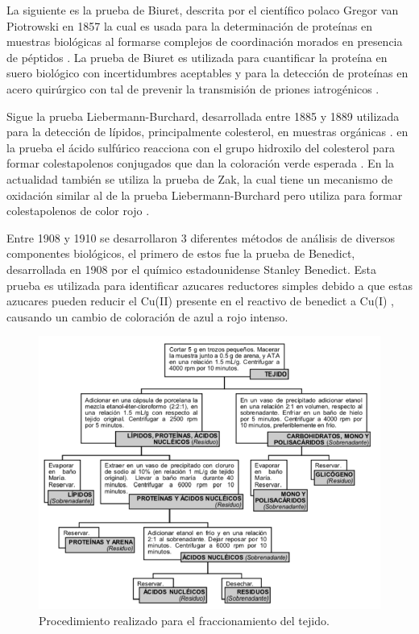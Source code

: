 \documentclass[fleqn,10pt]{SelfArx}
\begin{document}
	La siguiente es la prueba de Biuret, descrita por el científico polaco Gregor van Piotrowski en 1857 \cite{von1857neue} la cual es usada para la determinación de proteínas en muestras biológicas al formarse complejos de coordinación morados en presencia de péptidos \cite{rose1833ueber}. La prueba de Biuret es utilizada para cuantificar la proteína en suero biológico con incertidumbres aceptables \cite{zheng2017measurement} y para la detección de proteínas en acero quirúrgico con tal de prevenir la transmisión de priones iatrogénicos \cite{lipscomb2006sensitivity}.
	
	Sigue la prueba Liebermann-Burchard, desarrollada entre 1885 y 1889 \cite{xiong2007liebermann} utilizada para la detección de lípidos, principalmente colesterol, en muestras orgánicas \cite{barreto2005lipid}. en la prueba el ácido sulfúrico reacciona con el grupo hidroxilo del colesterol para formar colestapolenos conjugados que dan la coloración verde esperada \cite{xiong2007liebermann, burke1974mechanisms}. En la actualidad también se utiliza la prueba de Zak, la cual tiene un mecanismo de oxidación similar al de la prueba Liebermann-Burchard pero utiliza  para formar colestapolenos de color rojo \cite{burke1974mechanisms}.
	
	Entre 1908 y 1910 se desarrollaron 3 diferentes métodos de análisis de diversos componentes biológicos, el primero de estos fue la prueba de Benedict, desarrollada en 1908\cite{benedict1909reagent} por el químico estadounidense Stanley Benedict. Esta prueba es utilizada para identificar azucares reductores simples debido a que estas azucares pueden reducir el Cu(II) presente en el reactivo de benedict a Cu(I) \cite{daniels1960fehling}, causando un cambio de coloración de azul a rojo intenso. 

	\begin{figure}[h]
		\centering
		\includegraphics[width = 0.7\linewidth]{fraccionamiento.png}
		\caption{Procedimiento realizado para el fraccionamiento del tejido.}
		\label{fig: fraccionamiento}
	\end{figure}
\end{document}
